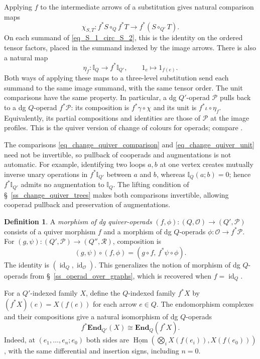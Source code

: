 \documentclass[11pt,letterpaper]{article}
\numberwithin{equation}{section}
\theoremstyle{plain}
\theoremstyle{definition}
\newtheorem{defn}[thm]{Definition}
\theoremstyle{remark}
\newcommand{\Hom}{\operatorname{Hom}}
\newcommand{\id}{\operatorname{id}}
\begin{document}
Applying $f$ to the intermediate arrows of a substitution gives
natural comparison maps
\begin{equation}\label{eq_change_quiver_comparison}
 \chi_{S,T}:f^*S\circ_Q f^*T\longrightarrow
 f^*(S\circ_{Q'}T).
\end{equation}
On each summand of \eqref{eq_S_1_circ_S_2}, this is the identity on
the ordered tensor factors, placed in the summand indexed by the
image arrows. There is also a natural map
\begin{equation}\label{eq_change_quiver_unit}
 \eta_f:\mathbb I_Q\longrightarrow f^*\mathbb I_{Q'},
 \qquad 1_e\longmapsto 1_{f(e)}.
\end{equation}
Both ways of applying these maps to a three-level substitution send
each summand to the same image summand, with the same tensor order.
The unit comparisons have the same property.
In particular, a dg $Q'$-operad $\mathscr P$ pulls back to a dg
$Q$-operad $f^*\mathscr P$: its composition is $f^*\gamma\circ\chi$
and its unit is $f^*\iota\circ\eta_f$. Equivalently, its partial
compositions and identities are those of $\mathscr P$ at the image
profiles. This is the quiver version of change of colours for
operads; compare \cite[\S~1.6]{BergerMoerdijkColoured}.

The comparisons \eqref{eq_change_quiver_comparison} and
\eqref{eq_change_quiver_unit} need not be invertible, so pullback of
cooperads and augmentations is not automatic. For example, identifying
two loops $a,b$ at one vertex creates mutually inverse unary operations
in $f^*\mathbb I_{Q'}$ between $a$ and $b$, whereas $\mathbb I_Q(a;b)=0$;
hence $f^*\mathbb I_{Q'}$ admits no augmentation to $\mathbb I_Q$.
The lifting condition of \S~\ref{ss_change_quiver_trees} makes both
comparisons invertible, allowing cooperad pullback and preservation of
augmentations.

\begin{defn}\label{defn_operad_morphism_over_quiver}
A \textit{morphism of dg quiver-operads}
$(f,\phi):(Q,\mathscr O)\to(Q',\mathscr P)$ consists of a quiver
morphism $f$ and a morphism of dg $Q$-operads
$\phi:\mathscr O\to f^*\mathscr P$.
For $(g,\psi):(Q',\mathscr P)\to(Q'',\mathscr R)$, composition is
\[
 (g,\psi)\circ(f,\phi)
   =(g\circ f,\,f^*\psi\circ\phi).
\]
The identity is $(\id_Q,\id_{\mathscr O})$. This generalizes the notion
of morphism of dg $Q$-operads from \S~\ref{ss_operad_over_graphs},
which is recovered when $f=\id_Q$.
\end{defn}

For a $Q'$-indexed family $X$, define the $Q$-indexed family $f^*X$
by $(f^*X)(e)=X(f(e))$ for each arrow $e\in Q$.
The endomorphism complexes and their compositions give a natural
isomorphism of dg $Q$-operads
\begin{equation}\label{eq_change_quiver_endomorphism}
 f^*\mathbf{End}_{Q'}(X)
 \cong\mathbf{End}_Q(f^*X).
\end{equation}
Indeed, at $(e_1,\ldots,e_n;e_0)$ both sides are
$\underline{\Hom}(\bigotimes_i X(f(e_i)),X(f(e_0)))$,
with the same differential and insertion signs, including $n=0$.
\end{document}
